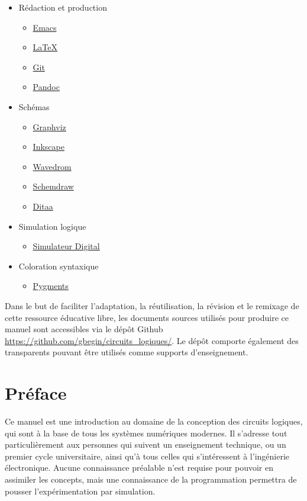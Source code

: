 \documentclass[letter, oneside]{book}
\begin{document}
\begin{itemize}
\item Rédaction et production
\begin{itemize}
\item \href{https://www.gnu.org/software/emacs/}{Emacs}
\item \href{https://www.latex-project.org/}{\LaTeX{}}
\item \href{https://git-scm.com}{Git}
\item \href{https://pandoc.org/}{Pandoc}
\end{itemize}
\item Schémas
\begin{itemize}
\item \href{https://graphviz.org/}{Graphviz}
\item \href{https://inkscape.org}{Inkscape}
\item \href{https://wavedrom.com/}{Wavedrom}
\item \href{https://schemdraw.readthedocs.io/en/latest/}{Schemdraw}
\item \href{https://ditaa.sourceforge.net/}{Ditaa}
\end{itemize}
\item Simulation logique
\begin{itemize}
\item \href{https://github.com/hneemann/Digital}{Simulateur Digital}
\end{itemize}
\item Coloration syntaxique
\begin{itemize}
\item \href{https://pygments.org/docs/quickstart/}{Pygments}
\end{itemize}
\end{itemize}

Dans le but de faciliter l'adaptation, la réutilisation, la révision
et le remixage de cette ressource éducative libre, les documents
sources utilisés pour produire ce manuel sont accessibles via le dépôt
Github \url{https://github.com/gbegin/circuits\_logiques/}. Le dépôt comporte
également des transparents pouvant être utilisés comme supports
d'enseignement.


\chapter*{Préface}
\label{sec:org683477d}
Ce manuel est une introduction au domaine de la conception des
circuits logiques, qui sont à la base de tous les systèmes numériques
modernes. Il s'adresse tout particulièrement aux personnes qui suivent
un enseignement technique, ou un premier cycle universitaire, ainsi
qu'à tous celles qui s'intéressent à l'ingénierie électronique.
Aucune connaissance préalable n'est requise pour pouvoir en assimiler
les concepts, mais une connaissance de la programmation permettra de
pousser l'expérimentation par simulation.
\end{document}
